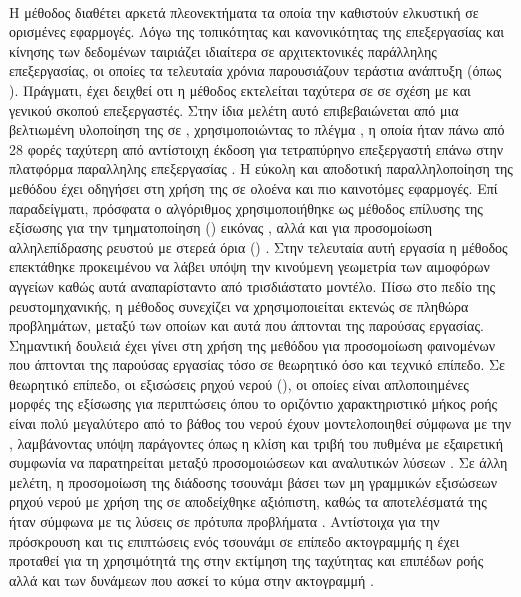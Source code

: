\paragraph{} Η μέθοδος διαθέτει αρκετά πλεονεκτήματα τα οποία την καθιστούν ελκυστική σε
ορισμένες εφαρμογές. Λόγω της τοπικότητας και κανονικότητας της επεξεργασίας και κίνησης
των δεδομένων ταιριάζει ιδιαίτερα σε  αρχιτεκτονικές παράλληλης επεξεργασίας, οι
οποίες τα τελευταία χρόνια παρουσιάζουν τεράστια ανάπτυξη (όπως ). Πράγματι,
έχει δειχθεί \cite{Bailey2009550} οτι η μέθοδος εκτελείται ταχύτερα σε  σε σχέση
με  και γενικού σκοπού επεξεργαστές. Στην ίδια μελέτη αυτό επιβεβαιώνεται από
μια βελτιωμένη υλοποίηση της  σε , χρησιμοποιώντας το πλέγμα
, η οποία ήταν πάνω από 28 φορές ταχύτερη από αντίστοιχη έκδοση για τετραπύρηνο
επεξεργαστή επάνω στην πλατφόρμα παραλληλης επεξεργασίας . Η εύκολη και
αποδοτική παραλληλοποίηση της μεθόδου έχει οδηγήσει στη χρήση της σε ολοένα και πιο
καινοτόμες εφαρμογές. Επί παραδείγματι, πρόσφατα ο αλγόριθμος χρησιμοποιήθηκε ως μέθοδος
επίλυσης της εξίσωσης  για την τμηματοποίηση () εικόνας
\cite{balla-arabe2011}, αλλά και για προσομοίωση αλληλεπίδρασης ρευστού με στερεά όρια
() \cite{nita2015}. Στην τελευταία αυτή εργασία η
μέθοδος επεκτάθηκε προκειμένου να λάβει υπόψη την κινούμενη γεωμετρία των αιμοφόρων
αγγείων καθώς αυτά αναπαρίσταντο από τρισδιάστατο μοντέλο. Πίσω στο πεδίο της
ρευστομηχανικής, η μέθοδος συνεχίζει να χρησιμοποιείται εκτενώς σε πληθώρα προβλημάτων,
μεταξύ των οποίων και αυτά που άπτονται της παρούσας εργασίας. Σημαντική δουλειά έχει
γίνει στη χρήση της μεθόδου για προσομοίωση φαινομένων που άπτονται της παρούσας εργασίας
τόσο σε θεωρητικό όσο και τεχνικό επίπεδο. Σε θεωρητικό επίπεδο, οι εξισώσεις ρηχού νερού
(), οι οποίες είναι απλοποιημένες μορφές της εξίσωσης
 για περιπτώσεις όπου το οριζόντιο χαρακτηριστικό μήκος ροής είναι πολύ
μεγαλύτερο από το βάθος του νερού έχουν μοντελοποιηθεί σύμφωνα με την ,
λαμβάνοντας υπόψη παράγοντες όπως η κλίση και τριβή του πυθμένα με εξαιρετική συμφωνία να
παρατηρείται μεταξύ προσομοιώσεων και αναλυτικών λύσεων \cite{Zhou20023527,
  Zhou2004lattice}. Σε άλλη μελέτη, η προσομοίωση της διάδοσης τσουνάμι βάσει των μη
γραμμικών εξισώσεων ρηχού νερού με χρήση της  σε  αποδείχθηκε αξιόπιστη,
καθώς τα αποτελέσματά της ήταν σύμφωνα με τις λύσεις σε πρότυπα προβλήματα
\cite{Janssen2012efficient}. Αντίστοιχα για την πρόσκρουση και τις επιπτώσεις ενός
τσουνάμι σε επίπεδο ακτογραμμής η  έχει προταθεί για τη χρησιμότητά της στην
εκτίμηση της ταχύτητας και επιπέδων ροής αλλά και των δυνάμεων που ασκεί το κύμα στην
ακτογραμμή \cite{Krafczyk2007}.

